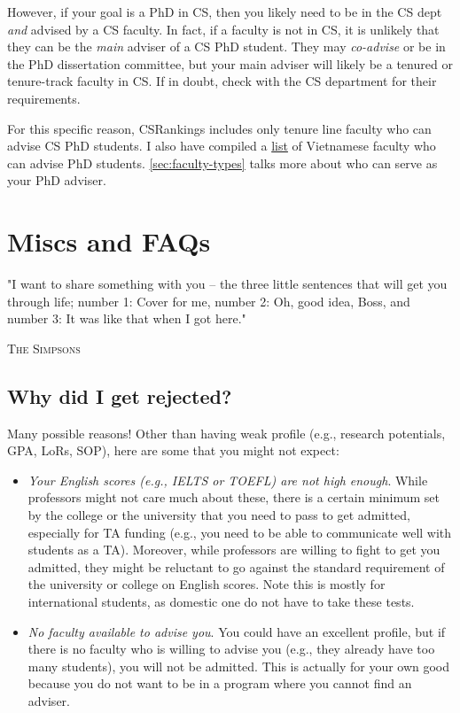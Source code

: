 \documentclass[oneside,11pt]{memoir}
\begin{document}
However, if your goal is a PhD in CS, then you likely need to be in the CS dept \emph{and} advised by a CS faculty. In fact, if a faculty is not in CS, it is unlikely that they can be the \emph{main} adviser of a CS PhD student. They may \emph{co-advise} or be in the PhD dissertation committee, but your main adviser will likely be a tenured or tenure-track faculty in CS. If in doubt, check with the CS department for their requirements.

For this specific reason,  CSRankings includes only tenure line faculty who can advise CS PhD students. I also have compiled a \href{https://github.com/dynaroars/dynaroars.github.io/wiki/Viet-CS-Profs-US}{list} of Vietnamese faculty who can advise PhD students. \autoref{sec:faculty-types} talks more about who can serve as your PhD adviser.


\chapter{Miscs and FAQs}
\epigraph{"I want to share something with you – the three little sentences that will get you through life; number 1: Cover for me, number 2: Oh, good idea, Boss, and number 3: It was like that when I got here."}{\textsc{The Simpsons}}

\section{Why did I get rejected?}
Many possible reasons!  Other than having weak profile (e.g., research potentials, GPA, LoRs, SOP), here are some that you might not expect:
\begin{itemize}
  \item  \emph{Your English scores (e.g., IELTS or TOEFL) are not high enough}.  While professors might not care much about these, there is a certain minimum set by the college or the university that you need to pass to get admitted, especially for TA funding (e.g., you need to be able to communicate well with students as a TA).  Moreover, while professors are willing to fight to get you admitted, they might be reluctant to go against the standard requirement of the university or college on English scores.  Note this is mostly for international students, as domestic one do not have to take these tests.

  \item \emph{No faculty available to advise you}.  You could have an excellent profile, but if there is no faculty who is willing to advise you (e.g., they already have too many students), you will not be admitted. This is actually for your own good because you do not want to be in a program where you cannot find an adviser.
\end{itemize}
\end{document}

